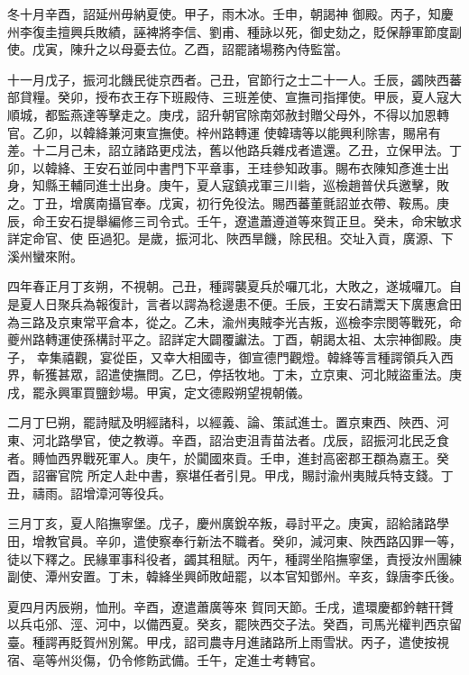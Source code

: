 \begin{pinyinscope}
 冬十月辛酉，詔延州毋納夏使。甲子，雨木冰。壬申，朝謁神
 御殿。丙子，知慶州李復圭擅興兵敗績，誣裨將李信、劉甫、種詠以死，御史劾之，貶保靜軍節度副使。戊寅，陳升之以母憂去位。乙酉，詔罷諸場務內侍監當。



 十一月戊子，振河北饑民徙京西者。己丑，官節行之士二十一人。壬辰，蠲陜西蕃部貸糧。癸卯，授布衣王存下班殿侍、三班差使、宣撫司指揮使。甲辰，夏人寇大順城，都監燕達等擊走之。庚戌，詔升朝官除南郊赦封贈父母外，不得以加恩轉官。乙卯，以韓絳兼河東宣撫使。梓州路轉運
 使韓璹等以能興利除害，賜帛有差。十二月己未，詔立諸路更戍法，舊以他路兵雜戍者遣還。乙丑，立保甲法。丁卯，以韓絳、王安石並同中書門下平章事，王珪參知政事。賜布衣陳知彥進士出身，知縣王輔同進士出身。庚午，夏人寇鎮戎軍三川砦，巡檢趙普伏兵邀擊，敗之。丁丑，增廣南攝官奉。戊寅，初行免役法。賜西蕃董氈詔並衣帶、鞍馬。庚辰，命王安石提舉編修三司令式。壬午，遼遣蕭遵道等來賀正旦。癸未，命宋敏求詳定命官、使
 臣過犯。是歲，振河北、陜西旱饑，除民租。交址入貢，廣源、下溪州蠻來附。



 四年春正月丁亥朔，不視朝。己丑，種諤襲夏兵於囉兀北，大敗之，遂城囉兀。自是夏人日聚兵為報復計，言者以諤為稔邊患不便。壬辰，王安石請鬻天下廣惠倉田為三路及京東常平倉本，從之。乙未，渝州夷賊李光吉叛，巡檢李宗閔等戰死，命夔州路轉運使孫構討平之。詔詳定大闢覆讞法。丁酉，朝謁太祖、太宗神御殿。庚子，
 幸集禧觀，宴從臣，又幸大相國寺，御宣德門觀燈。韓絳等言種諤領兵入西界，斬獲甚眾，詔遣使撫問。乙巳，停括牧地。丁未，立京東、河北賊盜重法。庚戌，罷永興軍買鹽鈔場。甲寅，定文德殿朔望視朝儀。



 二月丁巳朔，罷詩賦及明經諸科，以經義、論、策試進士。置京東西、陜西、河東、河北路學官，使之教導。辛酉，詔治吏沮青苗法者。戊辰，詔振河北民乏食者。賻恤西界戰死軍人。庚午，於闐國來貢。壬申，進封高密郡王頵為嘉王。癸酉，詔審官院
 所定人赴中書，察堪任者引見。甲戌，賜討渝州夷賊兵特支錢。丁丑，禱雨。詔增漳河等役兵。



 三月丁亥，夏人陷撫寧堡。戊子，慶州廣銳卒叛，尋討平之。庚寅，詔給諸路學田，增教官員。辛卯，遣使察奉行新法不職者。癸卯，減河東、陜西路囚罪一等，徒以下釋之。民緣軍事科役者，蠲其租賦。丙午，種諤坐陷撫寧堡，責授汝州團練副使、潭州安置。丁未，韓絳坐興師敗衄罷，以本官知鄧州。辛亥，錄唐李氏後。



 夏四月丙辰朔，恤刑。辛酉，遼遣蕭廣等來
 賀同天節。壬戌，遣環慶都鈐轄幵贇以兵屯邠、涇、河中，以備西夏。癸亥，罷陜西交子法。癸酉，司馬光權判西京留臺。種諤再貶賀州別駕。甲戌，詔司農寺月進諸路所上雨雪狀。丙子，遣使按視宿、亳等州災傷，仍令修飭武備。壬午，定進士考轉官。




\end{pinyinscope}
